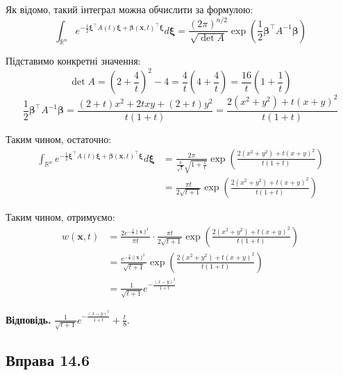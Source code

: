 \documentclass{hw_template}
\begin{document}
Як відомо, такий інтеграл можна обчислити за формулою:
\begin{equation*}
    \int_{\mathbb{R}^n}e^{-\frac{1}{2}\boldsymbol{\xi}^{\top}A(t)\boldsymbol{\xi} + \boldsymbol{\beta}(\mathbf{x},t)^{\top}\boldsymbol{\xi}}d\boldsymbol{\xi} = \frac{(2\pi)^{n/2}}{\sqrt{\det A}}\exp \left(\frac{1}{2}\boldsymbol{\beta}^{\top}A^{-1}\boldsymbol{\beta}\right)
\end{equation*}

Підставимо конкретні значення:
\begin{equation*}
    \det A = \left(2+\frac{4}{t}\right)^2 - 4 = \frac{4}{t}\left(4+\frac{4}{t}\right) = \frac{16}{t}\left(1+\frac{1}{t}\right)
\end{equation*}
\begin{equation*}
    \frac{1}{2}\boldsymbol{\beta}^{\top}A^{-1}\boldsymbol{\beta} = \frac{(2+t)x^2+2txy+(2+t)y^2}{t(1+t)} = \frac{2(x^2+y^2)+t(x+y)^2}{t(1+t)}
\end{equation*}

Таким чином, остаточно:
\begin{align*}
    \int_{\mathbb{R}^n}e^{-\frac{1}{2}\boldsymbol{\xi}^{\top}A(t)\boldsymbol{\xi} + \boldsymbol{\beta}(\mathbf{x},t)^{\top}\boldsymbol{\xi}}d\boldsymbol{\xi} &= \frac{2\pi}{\frac{4}{\sqrt{t}}\sqrt{1+\frac{1}{t}}}\exp \left(\frac{2(x^2+y^2)+t(x+y)^2}{t(1+t)}\right) \\
    &= \frac{\pi t}{2\sqrt{t+1}}\exp \left(\frac{2(x^2+y^2)+t(x+y)^2}{t(1+t)}\right)
\end{align*}

Таким чином, отримуємо:
\begin{align*}
    w(\mathbf{x},t) &= \frac{2e^{-\frac{2}{t}\|\mathbf{x}\|^2}}{\pi t}\cdot \frac{\pi t}{2\sqrt{t+1}}\exp \left(\frac{2(x^2+y^2)+t(x+y)^2}{t(1+t)}\right) \\
    &= \frac{e^{-\frac{2}{t}\|\mathbf{x}\|^2}}{\sqrt{t+1}}\exp \left(\frac{2(x^2+y^2)+t(x+y)^2}{t(1+t)}\right) \\
    &= \boxed{\frac{1}{\sqrt{t+1}}e^{-\frac{(x-y)^2}{1+t}}}
\end{align*}

\textbf{Відповідь.} $\frac{1}{\sqrt{t+1}}e^{-\frac{(x-y)^2}{1+t}} + \frac{t}{8}$.

\newpage

\subsection{Вправа 14.6}
\end{document}
